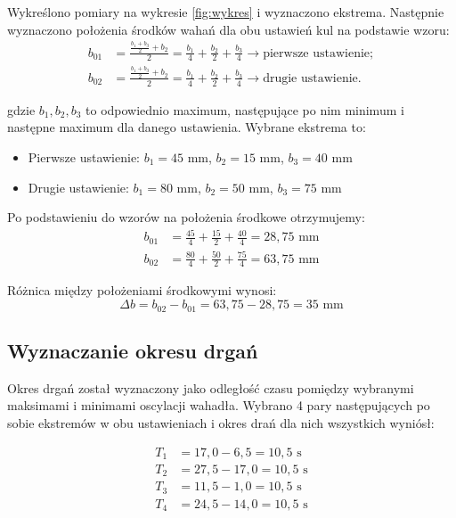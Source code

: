 \documentclass[a4paper,12pt]{article}
\begin{document}
Wykreślono pomiary na wykresie \ref{fig:wykres} i wyznaczono ekstrema. Następnie wyznaczono położenia środków wahań dla obu ustawień kul na podstawie wzoru:
\begin{align*}
    b_{01} & = \frac{\frac{b_1+b_3}{2}+b_2}{2} = \frac{b_1}{4} + \frac{b_2}{2} + \frac{b_3}{4} \rightarrow \text{pierwsze ustawienie}; \\
    b_{02} & = \frac{\frac{b_1+b_3}{2}+b_2}{2} = \frac{b_1}{4} + \frac{b_2}{2} + \frac{b_3}{4} \rightarrow \text{drugie ustawienie}.
\end{align*}

gdzie $b_1, b_2, b_3$ to odpowiednio maximum, następujące po nim minimum i następne maximum dla danego ustawienia.
Wybrane ekstrema to:

\begin{itemize}
    \item Pierwsze ustawienie: $b_1 = 45$ mm, $b_2 = 15$ mm, $b_3 = 40$ mm
    \item Drugie ustawienie: $b_1 = 80$ mm, $b_2 = 50$ mm, $b_3 = 75$ mm
\end{itemize}

Po podstawieniu do wzorów na położenia środkowe otrzymujemy:
\begin{align*}
    b_{01} &= \frac{45}{4} + \frac{15}{2} + \frac{40}{4} = 28{,}75 \text{ mm} \\
    b_{02} &= \frac{80}{4} + \frac{50}{2} + \frac{75}{4} = 63{,}75 \text{ mm}
\end{align*}

Różnica między położeniami środkowymi wynosi:
\begin{equation*}
    \Delta b = b_{02} - b_{01} = 63{,}75 - 28{,}75 = 35 \text{ mm}
\end{equation*}


\subsection{Wyznaczanie okresu drgań}

Okres drgań został wyznaczony jako odległość czasu pomiędzy wybranymi maksimami i minimami oscylacji wahadła. Wybrano 4 pary następujących po sobie ekstremów w obu ustawieniach i okres drań dla nich wszystkich wyniósł:

\begin{align*}
T_1 & = 17,0 - 6,5 = 10,5 \text{ s} \\
T_2 & = 27,5 - 17,0 = 10,5 \text{ s} \\
T_3 & = 11,5 - 1,0 = 10,5 \text{ s} \\
T_4 & = 24,5 - 14,0 = 10,5 \text{ s}
\end{align*}
\end{document}
